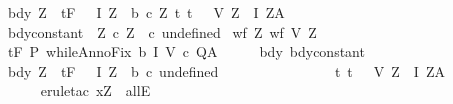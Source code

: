 \begin{isabellebody}
\ bdy{\isacharcolon}\ {\isachardoublequoteopen}{\isasymforall}Z\ {\isasymsigma}{\isachardot}\ {\isasymGamma}{\isacharcomma}{\isasymTheta}{\isasymturnstile}\isactrlsub t\isactrlbsub {\isacharslash}F\isactrlesub \ {\isacharparenleft}{\isacharbraceleft}{\isasymsigma}{\isacharbraceright}\ {\isasyminter}\ I\ Z\ {\isasyminter}\ b{\isacharparenright}\ {\isacharparenleft}c\ Z{\isacharparenright}\ {\isacharparenleft}{\isacharbraceleft}t{\isachardot}\ {\isacharparenleft}t{\isacharcomma}\ {\isasymsigma}{\isacharparenright}\ {\isasymin}\ V\ Z{\isacharbraceright}\ {\isasyminter}\ I\ Z{\isacharparenright}{\isacharcomma}A{\isachardoublequoteclose}\isanewline
{}\ bdy{\isacharunderscore}constant{\isacharcolon}\ \ {\isachardoublequoteopen}{\isasymforall}Z{\isachardot}\ c\ Z\ {\isacharequal}\ c\ undefined{\isachardoublequoteclose}\isanewline
{}\ wf{\isacharcolon}\ {\isachardoublequoteopen}{\isasymforall}Z{\isachardot}\ wf\ {\isacharparenleft}V\ Z{\isacharparenright}{\isachardoublequoteclose}\isanewline
{}\ {\isachardoublequoteopen}{\isasymGamma}{\isacharcomma}{\isasymTheta}{\isasymturnstile}\isactrlsub t\isactrlbsub {\isacharslash}F\isactrlesub \ P\ {\isacharparenleft}whileAnnoFix\ b\ I\ V\ c{\isacharparenright}\ Q{\isacharcomma}A{\isachardoublequoteclose}\isanewline
%
\isadelimproof
%
\endisadelimproof
%
\isatagproof
{}\isamarkupfalse%
\ {\isacharminus}\isanewline
\ \ \isamarkupfalse%
\ bdy\ bdy{\isacharunderscore}constant\isanewline
\ \ \isamarkupfalse%
\ bdy{\isacharprime}{\isacharcolon}\ {\isachardoublequoteopen}{\isasymAnd}Z{\isachardot}\ {\isasymforall}{\isasymsigma}{\isachardot}\ {\isasymGamma}{\isacharcomma}{\isasymTheta}{\isasymturnstile}\isactrlsub t\isactrlbsub {\isacharslash}F\isactrlesub \ {\isacharparenleft}{\isacharbraceleft}{\isasymsigma}{\isacharbraceright}\ {\isasyminter}\ I\ Z\ {\isasyminter}\ b{\isacharparenright}\ {\isacharparenleft}c\ undefined{\isacharparenright}\ \isanewline
\ \ \ \ \ \ \ \ \ \ \ \ \ \ \ {\isacharparenleft}{\isacharbraceleft}t{\isachardot}\ {\isacharparenleft}t{\isacharcomma}\ {\isasymsigma}{\isacharparenright}\ {\isasymin}\ V\ Z{\isacharbraceright}\ {\isasyminter}\ I\ Z{\isacharparenright}{\isacharcomma}A{\isachardoublequoteclose}\isanewline
\ \ \ \ \isamarkupfalse%
\ {\isacharminus}\ \isanewline
\ \ \ \ \isamarkupfalse%
\ {\isacharparenleft}erule{\isacharunderscore}tac\ x{\isacharequal}Z\ \ allE{\isacharparenright}\isanewline
\ \ \ \ \isamarkupfalse%

\end{isabellebody}
